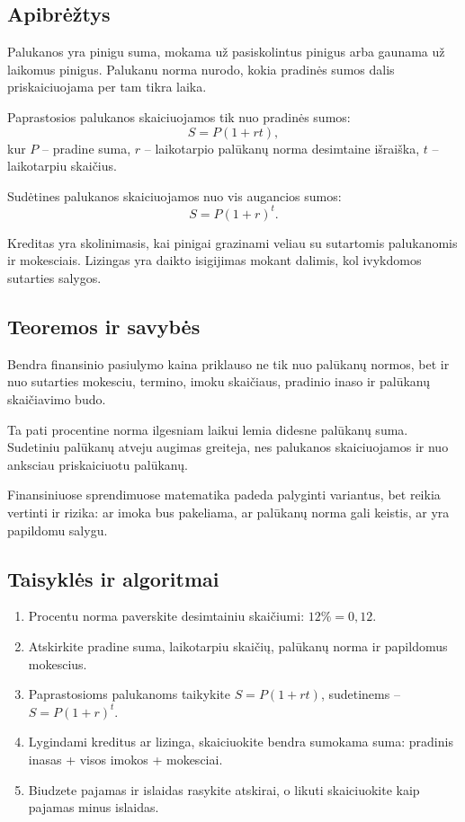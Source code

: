 \subsection{Apibrėžtys}
\begin{apibreztis}
Palukanos yra pinigu suma, mokama už pasiskolintus pinigus arba gaunama už laikomus pinigus. Palukanu norma nurodo, kokia pradinės sumos dalis priskaiciuojama per tam tikra laika.
\end{apibreztis}
\begin{apibreztis}
Paprastosios palukanos skaiciuojamos tik nuo pradinės sumos:
\[
S=P(1+rt),
\]
kur $P$ -- pradine suma, $r$ -- laikotarpio palūkanų norma desimtaine išraiška, $t$ -- laikotarpiu skaičius.
\end{apibreztis}
\begin{apibreztis}
Sudėtines palukanos skaiciuojamos nuo vis augancios sumos:
\[
S=P(1+r)^t.
\]
\end{apibreztis}
\begin{apibreztis}
Kreditas yra skolinimasis, kai pinigai grazinami veliau su sutartomis palukanomis ir mokesciais. Lizingas yra daikto isigijimas mokant dalimis, kol ivykdomos sutarties salygos.
\end{apibreztis}

\subsection{Teoremos ir savybės}
\begin{savybe}
Bendra finansinio pasiulymo kaina priklauso ne tik nuo palūkanų normos, bet ir nuo sutarties mokesciu, termino, imoku skaičiaus, pradinio inaso ir palūkanų skaičiavimo budo.
\end{savybe}
\begin{savybe}
Ta pati procentine norma ilgesniam laikui lemia didesne palūkanų suma. Sudetiniu palūkanų atveju augimas greiteja, nes palukanos skaiciuojamos ir nuo anksciau priskaiciuotu palūkanų.
\end{savybe}
\begin{pastaba}
Finansiniuose sprendimuose matematika padeda palyginti variantus, bet reikia vertinti ir rizika: ar imoka bus pakeliama, ar palūkanų norma gali keistis, ar yra papildomu salygu.
\end{pastaba}

\subsection{Taisyklės ir algoritmai}
\begin{enumerate}[label=\arabic*.]
\item Procentu norma paverskite desimtainiu skaičiumi: $12\%=0{,}12$.
\item Atskirkite pradine suma, laikotarpiu skaičių, palūkanų norma ir papildomus mokescius.
\item Paprastosioms palukanoms taikykite $S=P(1+rt)$, sudetinems -- $S=P(1+r)^t$.
\item Lygindami kreditus ar lizinga, skaiciuokite bendra sumokama suma: pradinis inasas + visos imokos + mokesciai.
\item Biudzete pajamas ir islaidas rasykite atskirai, o likuti skaiciuokite kaip pajamas minus islaidas.
\end{enumerate}
